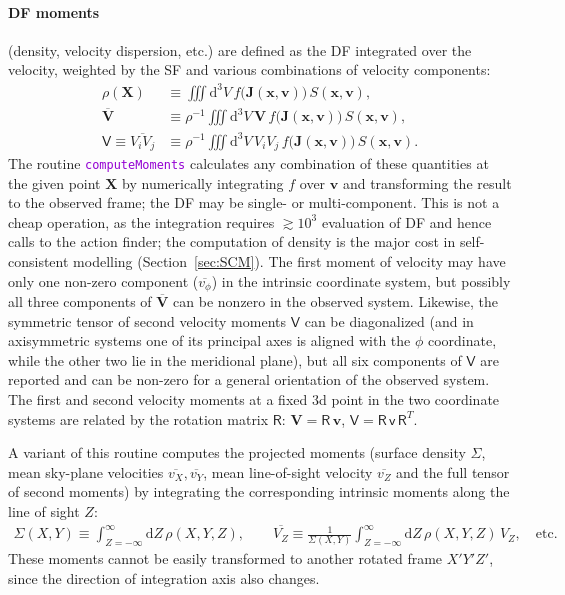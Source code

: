 \documentclass[12pt]{article}
\newcommand{\ttt}[1]{\textcolor{darkviolet}{\texttt{#1}}}
\renewcommand{\d}{\mathrm{d}}
\newcommand{\bv}{\boldsymbol{v}}
\newcommand{\bx}{\boldsymbol{x}}
\newcommand{\bX}{\boldsymbol{X}}
\newcommand{\bV}{\boldsymbol{V}}
\newcommand{\bJ}{\boldsymbol{J}}
\begin{document}
\paragraph{DF moments} (density, velocity dispersion, etc.) are defined as the DF integrated over the velocity, weighted by the SF and various combinations of velocity components:
\begin{align*}
\rho(\bX) &\equiv \iiint \d ^3V\, f\big(\bJ(\bx,\bv)\big)\,S(\bx,\bv), \\
\overline{\bV} &\equiv \rho^{-1} \iiint \d ^3V \,\bV\, f\big(\bJ(\bx,\bv)\big)\,S(\bx,\bv), \\
\mathsf{V} \equiv \overline{V_i V_j} &\equiv \rho^{-1} \iiint \d ^3V \,V_i V_j\, f\big(\bJ(\bx,\bv)\big)\,S(\bx,\bv).
\end{align*}
The routine \ttt{computeMoments} calculates any combination of these quantities at the given point $\bX$ by numerically integrating $f$ over $\bv$ and transforming the result to the observed frame; the DF may be single- or multi-component. 
This is not a cheap operation, as the integration requires $\gtrsim 10^3$ evaluation of DF and hence calls to the action finder; the computation of density is the major cost in self-consistent modelling (Section~\ref{sec:SCM}). The first moment of velocity may have only one non-zero component ($\overline{v_\phi}$) in the intrinsic coordinate system, but possibly all three components of $\overline{\bV}$ can be nonzero in the observed system. Likewise, the symmetric tensor of second velocity moments $\mathsf{V}$ can be diagonalized (and in axisymmetric systems one of its principal axes is aligned with the $\phi$ coordinate, while the other two lie in the meridional plane), but all six components of $\mathsf{V}$ are reported and can be non-zero for a general orientation of the observed system. The first and second velocity moments at a fixed 3d point in the two coordinate systems are related by the rotation matrix $\mathsf{R}$: $\bV = \mathsf{R}\,\bv$, $\mathsf{V} = \mathsf{R}\,\mathsf{v}\,\mathsf{R}^T$.

A variant of this routine computes the projected moments (surface density $\Sigma$, mean sky-plane velocities $\overline{v_X}, \overline{v_Y}$, mean line-of-sight velocity $\overline{v_Z}$ and the full tensor of second moments) by integrating the corresponding intrinsic moments along the line of sight $Z$:
\begin{align*}
\Sigma(X,Y) \equiv \int_{Z=-\infty}^\infty \d Z\, \rho(X,Y,Z), \qquad
\overline{V_Z} \equiv \frac{1}{\Sigma(X,Y)} \int_{Z=-\infty}^\infty \d Z\, \rho(X,Y,Z)\, V_Z, \quad\mbox{etc.}
\end{align*}
These moments cannot be easily transformed to another rotated frame $X'Y'Z'$, since the direction of integration axis also changes.
\end{document}
